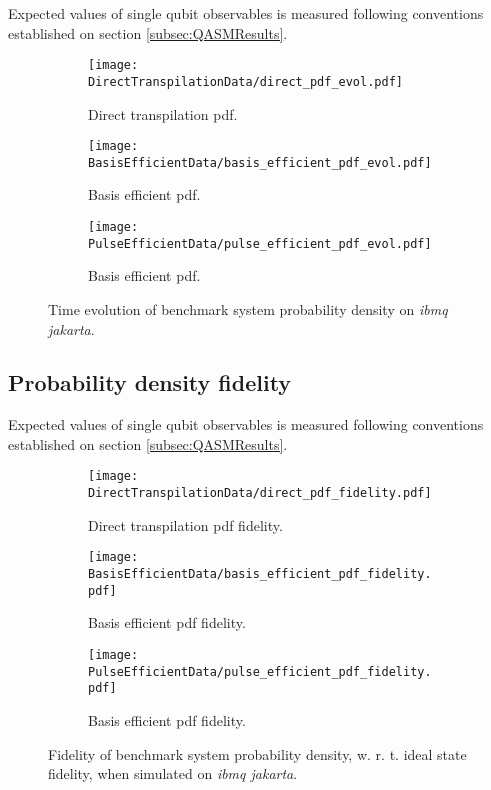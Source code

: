       Expected values of single qubit observables is measured following conventions established on section \ref{subsec:QASMResults}. 

      \begin{figure}
        \centering
        \begin{subfigure}[b]{1.0 \textwidth}
          \centering
          \texttt{[image: DirectTranspilationData/direct\_pdf\_evol.pdf]}
          \caption{Direct transpilation pdf.}
          \label{fig:PdfDirectTransp}
        \end{subfigure}
        \begin{subfigure}[b]{1.0 \textwidth}
          \centering
          \texttt{[image: BasisEfficientData/basis\_efficient\_pdf\_evol.pdf]}
          \caption{Basis efficient pdf.}
          \label{fig:PdfBasis}
        \end{subfigure}
        \begin{subfigure}[b]{1.0 \textwidth}
          \centering
          \texttt{[image: PulseEfficientData/pulse\_efficient\_pdf\_evol.pdf]}
          \caption{Basis efficient pdf.}
          \label{fig:PdfPulse}
        \end{subfigure}
        \caption{Time evolution of benchmark system probability density on \textit{ibmq jakarta}.}
        \label{fig:PdfExpectedValues}
      \end{figure}

    \subsection{Probability density fidelity}
    \label{subsec:PdfResults}

      Expected values of single qubit observables is measured following conventions established on section \ref{subsec:QASMResults}.

      \begin{figure}
        \centering
        \begin{subfigure}[b]{1.0 \textwidth}
          \centering
          \texttt{[image: DirectTranspilationData/direct\_pdf\_fidelity.pdf]}
          \caption{Direct transpilation pdf fidelity.}
          \label{fig:PdfDirectTransp}
        \end{subfigure}
        \begin{subfigure}[b]{1.0 \textwidth}
          \centering
          \texttt{[image: BasisEfficientData/basis\_efficient\_pdf\_fidelity.pdf]}
          \caption{Basis efficient pdf fidelity.}
          \label{fig:PdfBasis}
        \end{subfigure}
        \begin{subfigure}[b]{1.0 \textwidth}
          \centering
          \texttt{[image: PulseEfficientData/pulse\_efficient\_pdf\_fidelity.pdf]}
          \caption{Basis efficient pdf fidelity.}
          \label{fig:PdfPulse}
        \end{subfigure}
        \caption{Fidelity of benchmark system probability density, w. r. t. ideal state fidelity, when simulated on \textit{ibmq jakarta}.}
        \label{fig:PdfExpectedValues}
      \end{figure}

